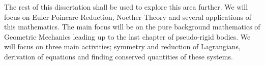 \noindent
The rest of this dissertation shall be used to explore this area further. We will focus on Euler-Poincare Reduction, Noether Theory and several applications of this mathematics. The main focus will be on the pure background mathematics of Geometric Mechanics leading up to the last chapter of pseudo-rigid bodies. We will focus on three main activities; symmetry and reduction of Lagrangians, derivation of equations and finding conserved quantities of these systems.


